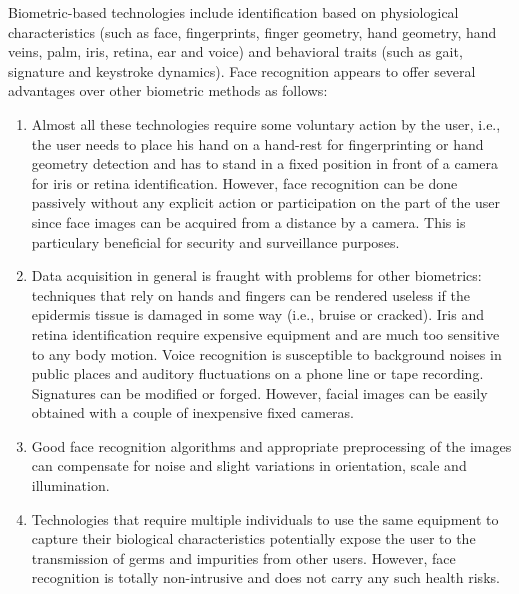 Biometric-based technologies include identification based on physiological characteristics (such as face, fingerprints, finger geometry, hand geometry, hand veins, palm, iris, retina, ear and voice) and behavioral traits (such as gait, signature and keystroke dynamics). Face recognition appears to offer several advantages over other biometric methods as follows:

\begin{enumerate}
    \item Almost all these technologies require some voluntary action by the user, i.e., the user needs to place his hand on a hand-rest for fingerprinting or hand geometry detection and has to stand in a fixed position in front of a camera for iris or retina identification. However, face recognition can be done passively without any explicit action or participation on the part of the user since face images can be acquired from a distance by a camera. This is particulary beneficial for security and surveillance purposes.
    \item Data acquisition in general is fraught with problems for other biometrics: techniques that rely on hands and fingers can be rendered useless if the epidermis tissue is damaged in some way (i.e., bruise or cracked). Iris and retina identification require expensive equipment and are much too sensitive to any body motion. Voice recognition is susceptible to background noises in public places and auditory fluctuations on a phone line or tape recording. Signatures can be modified or forged. However, facial images can be easily obtained with a couple of inexpensive fixed cameras. 
    \item Good face recognition algorithms and appropriate preprocessing of the images can compensate for noise and slight variations in orientation, scale and illumination.
    \item Technologies that require multiple individuals to use the same equipment to capture their biological characteristics potentially expose the user to the transmission of germs and impurities from other users. However, face recognition is totally non-intrusive and does not carry any such health risks.
\end{enumerate}
